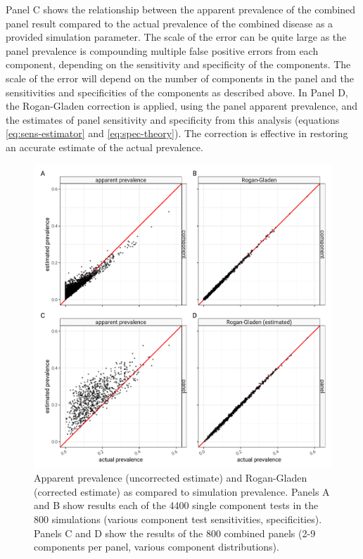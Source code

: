 \documentclass[a4paper, 12pt, twoside]{article}
\begin{document}
Panel C shows the relationship between the apparent prevalence of the combined panel result compared to the actual prevalence of the combined disease as a provided simulation parameter. The scale of the error can be quite large as the panel prevalence is compounding multiple false positive errors from each component, depending on the sensitivity and specificity of the components. The scale of the error will depend on the number of components in the panel and the sensitivities and specificities of the components as described above. In Panel D, the Rogan-Gladen correction is applied, using the panel apparent prevalence, and the estimates of panel sensitivity and specificity from this analysis (equations  \eqref{eq:sens-estimator} and  \eqref{eq:spec-theory}). The correction is effective in restoring an accurate estimate of the actual prevalence.

\begin{figure}[h!]
\centering
  \includegraphics{fig/qq-prevalence-prediction-v-simulation.png}
  \caption{Apparent prevalence (uncorrected estimate) and Rogan-Gladen (corrected estimate) as compared to simulation prevalence. Panels A and B show results each of the 4400 single component tests in the 800 simulations (various component test sensitivities, specificities). Panels C and D show the results of the 800 combined panels (2-9 components per panel, various component distributions).}
\label{fig:A3}
\end{figure}
\end{document}
